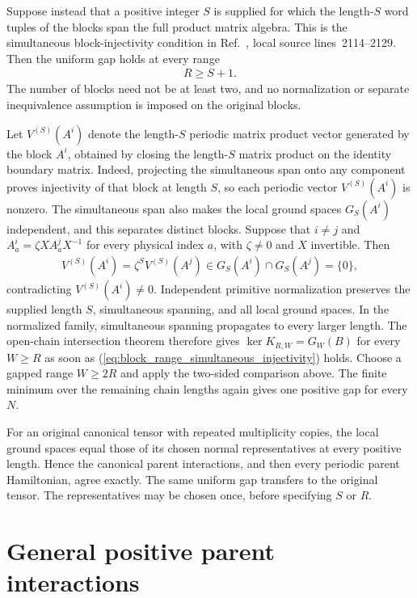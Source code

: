 \documentclass{article}
\begin{document}
Suppose instead that a positive integer $S$ is supplied for which the length-$S$
word tuples of the blocks span the full product matrix algebra. This is the
simultaneous block-injectivity condition in Ref.~\cite[Section~IV.C]{Cirac2021Matrix},
local source lines~2114--2129. Then the uniform gap holds at every range
\begin{align}
    R\geq S+1.
    \label{eq:block_range_simultaneous_injectivity}
\end{align}
The number of blocks need not be at least two, and no normalization or separate
inequivalence assumption is imposed on the original blocks.

Let $V^{(S)}(A^i)$ denote the length-$S$ periodic matrix product vector
generated by the block $A^i$, obtained by closing the length-$S$ matrix
product on the identity boundary matrix. Indeed, projecting the simultaneous
span onto any component proves injectivity of that block at length $S$, so
each periodic vector $V^{(S)}(A^i)$ is nonzero. The simultaneous span also makes the local ground spaces $G_S(A^i)$
independent, and this separates distinct blocks. Suppose that $i\neq j$ and
$A^i_a=\zeta XA^j_aX^{-1}$ for every physical index $a$, with $\zeta\neq0$ and
$X$ invertible. Then
\begin{align}
    V^{(S)}(A^i)=\zeta^SV^{(S)}(A^j)\in G_S(A^i)\cap G_S(A^j)=\{0\},
    \label{eq:block_range_separation}
\end{align}
contradicting $V^{(S)}(A^i)\neq0$. Independent
primitive normalization preserves the supplied length $S$, simultaneous
spanning, and all local ground spaces. In the normalized family, simultaneous
spanning propagates to every larger length. The open-chain intersection theorem
therefore gives $\ker K_{R,W}=G_W(B)$ for every $W\geq R$ as soon as (\ref{eq:block_range_simultaneous_injectivity}) holds.
Choose a gapped range $W\geq2R$ and apply the two-sided comparison above.
The finite minimum over the remaining chain lengths again gives one positive
gap for every $N$.

For an original canonical tensor with repeated multiplicity copies, the local
ground spaces equal those of its chosen normal representatives at every
positive length. Hence the canonical parent interactions, and then every
periodic parent Hamiltonian, agree exactly. The same uniform gap transfers to
the original tensor. The representatives may be chosen once, before specifying
$S$ or $R$.

\section{General positive parent interactions}
\end{document}
